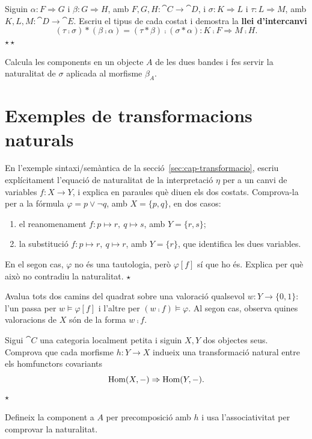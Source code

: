 \begin{exercici}
Siguin $\alpha\colon F\Rightarrow G$ i $\beta\colon G\Rightarrow H$, amb $F,G,H\colon\cat{C}\to\cat{D}$, i $\sigma\colon K\Rightarrow L$ i $\tau\colon L\Rightarrow M$, amb $K,L,M\colon\cat{D}\to\cat{E}$. Escriu el tipus de cada costat i demostra la \textbf{llei d'intercanvi}
\[
(\tau\comp\sigma)\ast(\beta\comp\alpha)=(\tau\ast\beta)\comp(\sigma\ast\alpha)\colon K\comp F\Rightarrow M\comp H.
\]
\hfill{\normalfont$\star\star$}
\begin{indicacio}
Calcula les components en un objecte $A$ de les dues bandes i fes servir la naturalitat de $\sigma$ aplicada al morfisme $\beta_A$.
\end{indicacio}
\end{exercici}

\section{Exemples de transformacions naturals}

\begin{exercici}
En l'exemple sintaxi/semàntica de la secció~\ref{sec:cap-transformacio}, escriu explícitament l'equació de naturalitat de la interpretació $\eta$ per a un canvi de variables $f\colon X\to Y$, i explica en paraules què diuen els dos costats. Comprova-la per a la fórmula $\varphi=p\lor\lnot q$, amb $X=\{p,q\}$, en dos casos:
\begin{enumerate}
  \item el reanomenament $f\colon p\mapsto r,\ q\mapsto s$, amb $Y=\{r,s\}$;
  \item la substitució $f\colon p\mapsto r,\ q\mapsto r$, amb $Y=\{r\}$, que identifica les dues variables.
\end{enumerate}
En el segon cas, $\varphi$ no és una tautologia, però $\varphi[f]$ sí que ho és. Explica per què això no contradiu la naturalitat. \hfill{\normalfont$\star$}
\begin{indicacio}
Avalua tots dos camins del quadrat sobre una valoració qualsevol $w\colon Y\to\{0,1\}$: l'un passa per $w\models\varphi[f]$ i l'altre per $(w\comp f)\models\varphi$. Al segon cas, observa quines valoracions de $X$ són de la forma $w\comp f$.
\end{indicacio}
\end{exercici}

\begin{exercici}
Sigui $\cat{C}$ una categoria localment petita i siguin $X,Y$ dos objectes seus. Comprova que cada morfisme $h\colon Y\to X$ indueix una transformació natural entre els homfunctors covariants
\[
\operatorname{Hom}(X,-)\Rightarrow\operatorname{Hom}(Y,-).
\]
\hfill{\normalfont$\star$}
\begin{indicacio}
Defineix la component a $A$ per precomposició amb $h$ i usa l'associativitat per comprovar la naturalitat.
\end{indicacio}
\end{exercici}

